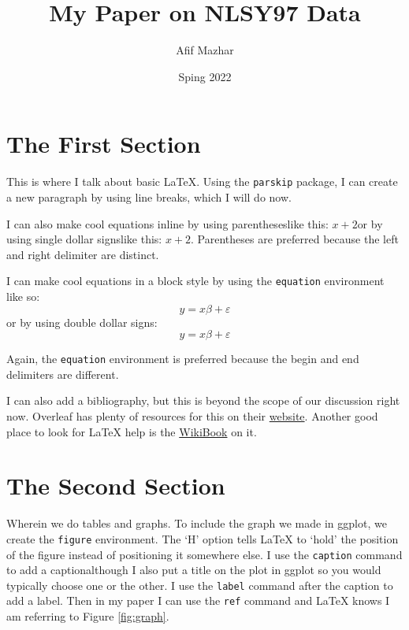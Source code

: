 \documentclass{article}
\author{Afif Mazhar}
\title{My Paper on NLSY97 Data}
\date{Sping 2022}
\begin{document}
\maketitle

\section{The First Section}

This is where I talk about basic \LaTeX. Using the \texttt{parskip} package, I can create a new paragraph by using line breaks, which I will do now.

I can also make cool equations inline by using parentheses{\textemdash}like this: \(x + 2\){\textemdash}or by using single dollar signs{\textemdash}like this: $x+2$. Parentheses are preferred because the left and right delimiter are distinct.

I can make cool equations in a block style by using the \texttt{equation} environment like so:
\begin{equation*}
    y = x\beta + \varepsilon
\end{equation*}
or by using double dollar signs:
$$
    y = x\beta + \varepsilon
$$

Again, the \texttt{equation} environment is preferred because the begin and end delimiters are different.

I can also add a bibliography, but this is beyond the scope of our discussion right now. Overleaf has plenty of resources for this on their \href{https://www.overleaf.com/learn}{website}. Another good place to look for LaTeX help is the \href{https://en.wikibooks.org/wiki/LaTeX}{WikiBook} on it.

\newpage

\section{The Second Section}

Wherein we do tables and graphs. To include the graph we made in ggplot, we create the \texttt{figure} environment. The `H' option tells LaTeX to `hold' the position of the figure instead of positioning it somewhere else. I use the \texttt{caption} command to add a caption{\textemdash}although I also put a title on the plot in ggplot so you would typically choose one or the other. I use the \texttt{label} command after the caption to add a label. Then in my paper I can use the \texttt{ref} command and LaTeX knows I am referring to Figure \ref{fig:graph}.
\end{document}
